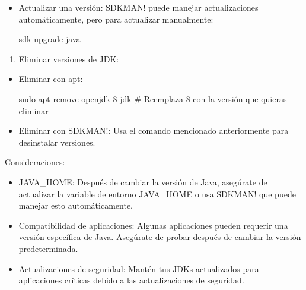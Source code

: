 \documentclass[
  jou,
  floatsintext,
  longtable,
  a4paper,
  nolmodern,
  notxfonts,
  notimes,
  12pt,
  colorlinks=true,linkcolor=blue,citecolor=blue,urlcolor=blue]{apa7}
\newenvironment{Shaded}{\begin{snugshade}}{\end{snugshade}}
\newcommand{\CommentTok}[1]{\textcolor[rgb]{0.37,0.37,0.37}{#1}}
\newcommand{\ExtensionTok}[1]{\textcolor[rgb]{0.00,0.23,0.31}{#1}}
\newcommand{\FunctionTok}[1]{\textcolor[rgb]{0.28,0.35,0.67}{#1}}
\newcommand{\NormalTok}[1]{\textcolor[rgb]{0.00,0.23,0.31}{#1}}
\newcommand{\OperatorTok}[1]{\textcolor[rgb]{0.37,0.37,0.37}{#1}}
\providecommand{\tightlist}{%
  \setlength{\itemsep}{0pt}\setlength{\parskip}{0pt}}
\begin{document}
\begin{itemize}
\begin{Shaded}
\begin{Highlighting}[]
\ExtensionTok{sdk}\NormalTok{ uninstall java }\OperatorTok{\textless{}}\NormalTok{version{-}id}\OperatorTok{\textgreater{}}
\end{Highlighting}
\end{Shaded}
\item
  Actualizar una versión: SDKMAN! puede manejar actualizaciones
  automáticamente, pero para actualizar manualmente:

\begin{Shaded}
\begin{Highlighting}[]
\ExtensionTok{sdk}\NormalTok{ upgrade java}
\end{Highlighting}
\end{Shaded}
\end{itemize}

\begin{enumerate}
\def\labelenumi{\arabic{enumi}.}
\tightlist
\item
  Eliminar versiones de JDK:
\end{enumerate}

\begin{itemize}
\item
  Eliminar con apt:

\begin{Shaded}
\begin{Highlighting}[]
\FunctionTok{sudo}\NormalTok{ apt remove openjdk{-}8{-}jdk  }\CommentTok{\# Reemplaza 8 con la versión que quieras eliminar}
\end{Highlighting}
\end{Shaded}
\item
  Eliminar con SDKMAN!: Usa el comando mencionado anteriormente para
  desinstalar versiones.
\end{itemize}

Consideraciones:

\begin{itemize}
\item
  JAVA\_HOME: Después de cambiar la versión de Java, asegúrate de
  actualizar la variable de entorno JAVA\_HOME o usa SDKMAN! que puede
  manejar esto automáticamente.
\item
  Compatibilidad de aplicaciones: Algunas aplicaciones pueden requerir
  una versión específica de Java. Asegúrate de probar después de cambiar
  la versión predeterminada.
\item
  Actualizaciones de seguridad: Mantén tus JDKs actualizados para
  aplicaciones críticas debido a las actualizaciones de seguridad.
\end{itemize}
\end{document}
